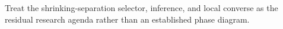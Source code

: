 Treat the shrinking-separation selector, inference, and local converse as the residual research agenda rather than an established phase diagram.